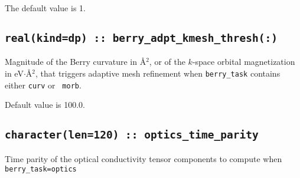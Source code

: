 The default value is 1.


\subsection[berry\_adpt\_kmesh\_thresh]{\tt real(kind=dp) :: berry\_adpt\_kmesh\_thresh(:)}

Magnitude of the Berry curvature in \AA$^2$, or of the $k$-space
orbital magnetization in eV$\cdot$\AA$^2$, that triggers adaptive mesh
refinement when {\tt berry\_task} contains either {\tt curv} or {\tt
  morb}.

Default value is 100.0.

\subsection[berry\_spectrum\_time\_parity]{\tt character(len=120) ::  optics\_time\_parity}
Time parity of the optical conductivity tensor components to compute
when {\tt berry\_task=optics}

